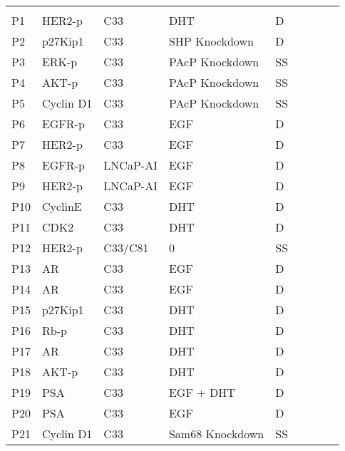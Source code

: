 \begin{center}
\label{prediction_table}
\begin{scriptsize}
\begin{supertabular}{l l l l l l l l l }  
\hline \\ 												

P1 & HER2-p & C33 & DHT  & D & \cite{Meng2000} \\
P2  & p27Kip1 & C33 & SHP Knockdown  & D & \cite{Rodriguez-Ubreva2010}\\
P3  & ERK-p & C33 & PAcP Knockdown  & SS &  \cite{Chuang2010}\\
P4  & AKT-p & C33 & PAcP Knockdown  & SS &  \cite{Chuang2010}\\
P5  & Cyclin D1 & C33 & PAcP Knockdown  & SS &  \cite{Chuang2010}\\
P6  & EGFR-p & C33 & EGF  & D & \cite{Chen2011}\\
P7  & HER2-p & C33 & EGF  & D & \cite{Chen2011}\\
P8  & EGFR-p & LNCaP-AI & EGF  & D & \cite{Chen2011}\\
P9  & HER2-p & LNCaP-AI & EGF  & D & \cite{Chen2011}\\
P10  & CyclinE & C33 & DHT  & D & \cite{Knudsen1998}\\
P11  & CDK2 & C33 & DHT  & D & \cite{Knudsen1998}\\
P12  & HER2-p & C33/C81 & 0  & SS & \cite{Chuang2010}\\
P13  & AR & C33 & EGF  & D & \cite{Cai2009}\\
P14  & AR & C33 & EGF  & D & \cite{Cinar2005}\\
P15  & p27Kip1 & C33 & DHT  & D & \cite{Fang2012}\\
P16  & Rb-p & C33 & DHT  & D & \cite{Knudsen1998}\\
P17  & AR & C33 & DHT  & D & \cite{Cai2009}\\
P18  & AKT-p & C33 & DHT  & D & \cite{Cai2009}\\
P19  & PSA & C33 & EGF + DHT  & D & \cite{Cai2009}\\
P20  & PSA & C33 & EGF  & D & \cite{Cai2009}\\
P21  & Cyclin D1 & C33 & Sam68 Knockdown  & SS & \cite{Busa2007}\\

\end{supertabular}
\end{scriptsize}
\end{center}
